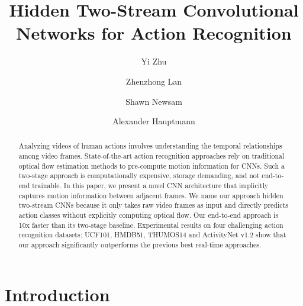 \documentclass[runningheads]{llncs}
\begin{document}
	\title{Hidden Two-Stream Convolutional Networks for Action Recognition}  



	\author{Yi Zhu \and
		Zhenzhong Lan  \and
		Shawn Newsam \and
		Alexander Hauptmann }





	
	\maketitle
	
\begin{abstract}
		Analyzing videos of human actions involves understanding the temporal relationships among video frames. State-of-the-art action recognition approaches rely on traditional optical flow estimation methods to pre-compute motion information for CNNs. Such a two-stage approach is computationally expensive, storage demanding, and not end-to-end trainable. In this paper, we present a novel CNN architecture that implicitly captures motion information between adjacent frames. We name our approach hidden two-stream CNNs because it only  takes  raw  video  frames  as input  and  directly  predicts  action classes  without  explicitly computing optical flow. Our end-to-end approach is 10x faster than its two-stage baseline. Experimental results on four challenging action recognition datasets: UCF101, HMDB51, THUMOS14 and ActivityNet v1.2 show that our approach significantly outperforms the previous best real-time approaches. 
		
	\end{abstract}
\section{Introduction}
	\label{sec:intro}
	
\end{document}
